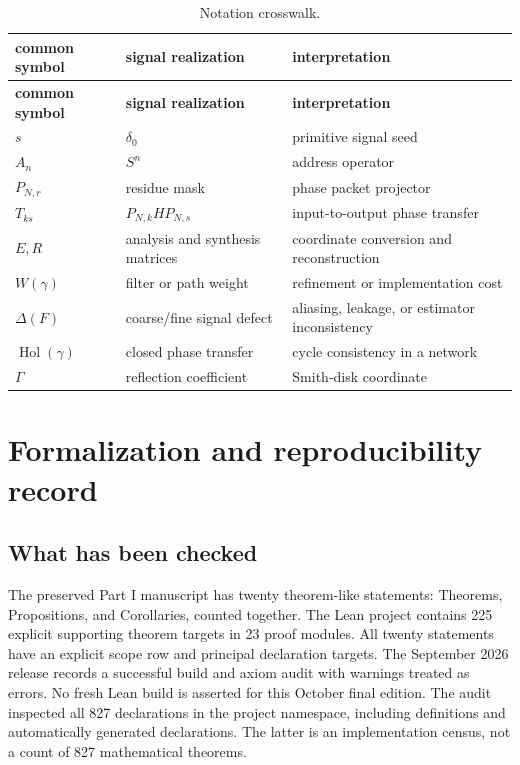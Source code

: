 \documentclass[11pt,a4paper]{article}
\theoremstyle{definition}
\theoremstyle{remark}
\newcommand{\Gam}{\Gamma}
\begin{document}
\begin{longtable}{L{0.20\textwidth}L{0.33\textwidth}L{0.37\textwidth}}
\caption{Notation crosswalk.}\label{tab:notation}\\
\toprule
\textbf{common symbol}&\textbf{signal realization}&\textbf{interpretation}\\
\midrule
\endfirsthead
\toprule
\textbf{common symbol}&\textbf{signal realization}&\textbf{interpretation}\\
\midrule
\endhead
$s$&$\delta_0$&primitive signal seed\\
$A_n$&$S^n$&address operator\\
$P_{N,r}$&residue mask&phase packet projector\\
$T_{ks}$&$P_{N,k}HP_{N,s}$&input-to-output phase transfer\\
$E,R$&analysis and synthesis matrices&coordinate conversion and reconstruction\\
$W(\gamma)$&filter or path weight&refinement or implementation cost\\
$\Delta(F)$&coarse/fine signal defect&aliasing, leakage, or estimator inconsistency\\
$\operatorname{Hol}(\gamma)$&closed phase transfer&cycle consistency in a network\\
$\Gam$&reflection coefficient&Smith-disk coordinate\\
\bottomrule
\end{longtable}

\clearpage
\section{Formalization and reproducibility record}\label{core:section:21}\label{sec:formalization}

\subsection{What has been checked}

The preserved Part I manuscript has twenty theorem-like statements: Theorems, Propositions, and Corollaries, counted together. The Lean project contains 225 explicit supporting theorem targets in 23 proof modules. All twenty statements have an explicit scope row and principal declaration targets. The September 2026 release records a successful build and axiom audit with warnings treated as errors. No fresh Lean build is asserted for this October final edition. The audit inspected all 827 declarations in the project namespace, including definitions and automatically generated declarations. The latter is an implementation census, not a count of 827 mathematical theorems.
\end{document}
